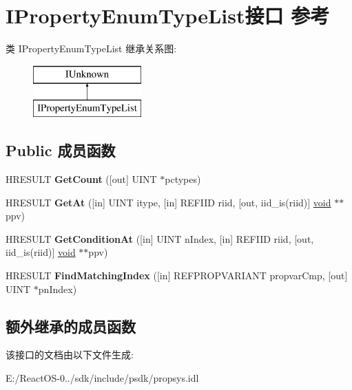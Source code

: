 \hypertarget{interface_i_property_enum_type_list}{}\section{I\+Property\+Enum\+Type\+List接口 参考}
\label{interface_i_property_enum_type_list}
类 I\+Property\+Enum\+Type\+List 继承关系图\+:\begin{figure}[H]
\begin{center}
\leavevmode
\includegraphics[height=2.000000cm]{interface_i_property_enum_type_list}
\end{center}
\end{figure}
\subsection*{Public 成员函数}
\begin{DoxyCompactItemize}
\item 
\mbox{\label{interface_i_property_enum_type_list_a3e0b68681d29bd6b3c0125edb094df0d}} 
H\+R\+E\+S\+U\+LT {\bfseries Get\+Count} (\mbox{[}out\mbox{]} U\+I\+NT $\ast$pctypes)
\item 
\mbox{\label{interface_i_property_enum_type_list_adcf154bfabd11d41e7298b5f395be154}} 
H\+R\+E\+S\+U\+LT {\bfseries Get\+At} (\mbox{[}in\mbox{]} U\+I\+NT itype, \mbox{[}in\mbox{]} R\+E\+F\+I\+ID riid, \mbox{[}out, iid\+\_\+is(riid)\mbox{]} \hyperlink{interfacevoid}{void} $\ast$$\ast$ppv)
\item 
\mbox{\label{interface_i_property_enum_type_list_ac646786483c0700aef26b19bd0be6b14}} 
H\+R\+E\+S\+U\+LT {\bfseries Get\+Condition\+At} (\mbox{[}in\mbox{]} U\+I\+NT n\+Index, \mbox{[}in\mbox{]} R\+E\+F\+I\+ID riid, \mbox{[}out, iid\+\_\+is(riid)\mbox{]} \hyperlink{interfacevoid}{void} $\ast$$\ast$ppv)
\item 
\mbox{\label{interface_i_property_enum_type_list_a4d2dabf4869c06bca62940b1e79c1b32}} 
H\+R\+E\+S\+U\+LT {\bfseries Find\+Matching\+Index} (\mbox{[}in\mbox{]} R\+E\+F\+P\+R\+O\+P\+V\+A\+R\+I\+A\+NT propvar\+Cmp, \mbox{[}out\mbox{]} U\+I\+NT $\ast$pn\+Index)
\end{DoxyCompactItemize}
\subsection*{额外继承的成员函数}


该接口的文档由以下文件生成\+:\begin{DoxyCompactItemize}
\item 
E\+:/\+React\+O\+S-\/0../sdk/include/psdk/propsys.\+idl\end{DoxyCompactItemize}
